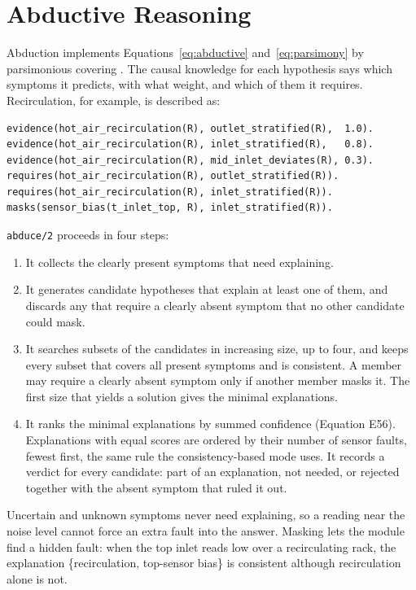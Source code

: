 \section{Abductive Reasoning}
\label{sec:abductive}

Abduction implements Equations~\eqref{eq:abductive} and~\eqref{eq:parsimony} by parsimonious covering \parencite{peng1990}. The causal knowledge for each hypothesis says which symptoms it predicts, with what weight, and which of them it requires. Recirculation, for example, is described as:
\begin{lstlisting}
evidence(hot_air_recirculation(R), outlet_stratified(R),  1.0).
evidence(hot_air_recirculation(R), inlet_stratified(R),   0.8).
evidence(hot_air_recirculation(R), mid_inlet_deviates(R), 0.3).
requires(hot_air_recirculation(R), outlet_stratified(R)).
requires(hot_air_recirculation(R), inlet_stratified(R)).
masks(sensor_bias(t_inlet_top, R), inlet_stratified(R)).
\end{lstlisting}
\texttt{abduce/2} proceeds in four steps:
\begin{enumerate}
  \item It collects the clearly present symptoms that need explaining.
  \item It generates candidate hypotheses that explain at least one of them, and discards any that require a clearly absent symptom that no other candidate could mask.
  \item It searches subsets of the candidates in increasing size, up to four, and keeps every subset that covers all present symptoms and is consistent. A member may require a clearly absent symptom only if another member masks it. The first size that yields a solution gives the minimal explanations.
  \item It ranks the minimal explanations by summed confidence (Equation E56). Explanations with equal scores are ordered by their number of sensor faults, fewest first, the same rule the consistency-based mode uses. It records a verdict for every candidate: part of an explanation, not needed, or rejected together with the absent symptom that ruled it out.
\end{enumerate}
Uncertain and unknown symptoms never need explaining, so a reading near the noise level cannot force an extra fault into the answer. Masking lets the module find a hidden fault: when the top inlet reads low over a recirculating rack, the explanation \{recirculation, top-sensor bias\} is consistent although recirculation alone is not.

